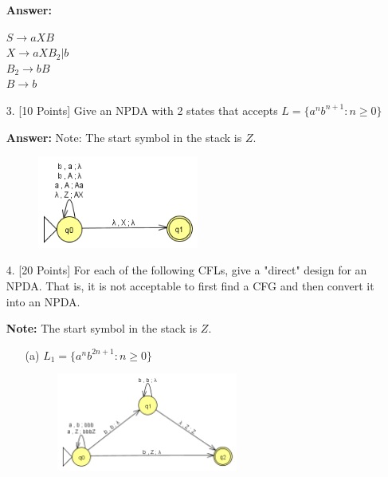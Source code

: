 \documentclass[12pt]{article}
\begin{document}
\begin{spacing}{1.5}
\begin{enumerate}
                  \textbf{Answer:}

                  $S \rightarrow aXB$ \\
                  $X \rightarrow aXB_2 | b$ \\
                  $B_2 \rightarrow bB$ \\
                  $B \rightarrow b$

            \item[3.] [10 Points] Give an NPDA with 2 states that accepts $L=\{a^nb^{n+1} : n \geq 0\}$

                  \textbf{Answer:} Note: The start symbol in the stack is $Z$.

                  \begin{figure}[h!]
                        \centering
                        \includegraphics[width=0.5\textwidth]{img/q3/q3.png}
                  \end{figure}

                  \newpage
            \item[4.] [20 Points] For each of the following CFLs, give a "direct" design for an NPDA. That is, it is not acceptable to first find a CFG and then convert it into an NPDA.

                  \textbf{Note:} The start symbol in the stack is $Z$.

                  \begin{enumerate}
                        \item[(a)] $L_1=\{a^nb^{2n+1} : n \geq 0 \}$

                              \begin{figure}[h!]
                                    \centering
                                    \includegraphics[width=0.6\textwidth]{img/q4/q4a.png}
                              \end{figure}


\end{enumerate}
\end{enumerate}
\end{spacing}
\end{document}
